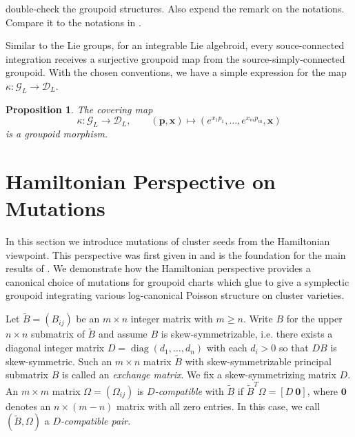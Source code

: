 \documentclass{amsart}
\newtheorem{proposition}[theorem]{Proposition}
\numberwithin{equation}{section}
\newcommand{\bfp}{\mathbf{p}}
\newcommand{\bfx}{\mathbf{x}}
\newcommand{\cG}{\mathcal{G}}
\newcommand{\cD}{\mathcal{D}}
\newcommand{\diag}{\operatorname{diag}}
\begin{document}
{\color{red} double-check the groupoid structures. Also expend the remark on the notations. Compare it to the notations in \cite{MR2470108}.}

Similar to the Lie groups, for an integrable Lie algebroid, every souce-connected integration receives a surjective groupoid map from the source-simply-connected groupoid. With the chosen conventions, we have a simple expression for the map $\kappa: \cG_L \to \cD_L$.

\begin{proposition}
The covering map
$$
	\kappa: \cG_L \to \cD_L, \qquad (\bfp, \bfx) \mapsto (e^{x_1p_1}, \ldots, e^{x_mp_m}, \bfx)
$$
is a groupoid morphism.
\end{proposition}


\section{Hamiltonian Perspective on Mutations}
\label{sec:cluster}

In this section we introduce mutations of cluster seeds from the Hamiltonian viewpoint.
This perspective was first given in \cite{MR2470108} and is the foundation for the main results of \cite{MR3691969}.
We demonstrate how the Hamiltonian perspective provides a canonical choice of mutations for groupoid charts which glue to give a symplectic groupoid integrating various log-canonical Poisson structure on cluster varieties.

Let $\tilde B=(B_{ij})$ be an $m\times n$ integer matrix with $m\ge n$.  
Write $B$ for the upper $n\times n$ submatrix of $\tilde B$ and assume $B$ is skew-symmetrizable, i.e. there exists a diagonal integer matrix $D=\diag(d_1,\ldots,d_n)$ with each $d_i>0$ so that $DB$ is skew-symmetric. 
Such an $m\times n$ matrix $\tilde B$ with skew-symmetrizable principal submatrix $B$ is called an \emph{exchange matrix}.
We fix a skew-symmetrizing matrix $D$.
An $m\times m$ matrix $\Omega=(\Omega_{ij})$ is \emph{$D$-compatible} with $\tilde B$ if $\tilde B^T\Omega=[D\ \boldsymbol{0}]$, where $\boldsymbol{0}$ denotes an $n\times(m-n)$ matrix with all zero entries.
In this case, we call $(\tilde B,\Omega)$ a \emph{$D$-compatible pair}.
\end{document}

